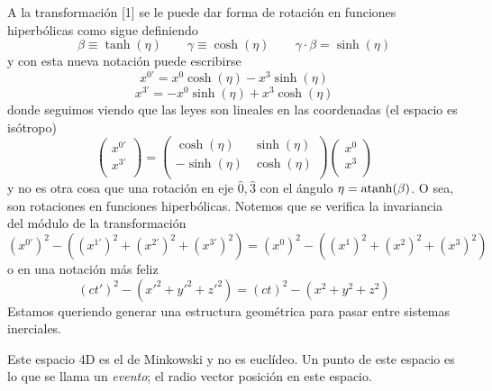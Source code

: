 \documentclass[10pt,oneside]{CBFT_book}
\begin{document}
A la transformación [1] se le puede dar forma de rotación en funciones hiperbólicas como sigue
definiendo
\[
	\beta \equiv \tanh(\eta) \qquad \gamma \equiv \cosh(\eta) \qquad 
	\gamma\cdot \beta = \sinh(\eta)
\]
y con esta nueva notación puede escribirse
\[
	x^{0'} = x^0 \cosh( \eta ) - x^3 \sinh( \eta )
\]
\[
	x^{3'} = -x^0 \sinh( \eta ) + x^3 \cosh( \eta )
\]
donde seguimos viendo que las leyes son lineales en las coordenadas (el espacio es isótropo)
\[
	\begin{pmatrix}
	 x^{0'} \\
	 x^{3'} \\
	\end{pmatrix}
	=
	\begin{pmatrix}
	\cosh( \eta ) & \sinh( \eta ) \\
	-\sinh( \eta ) & \cosh( \eta ) \\
	\end{pmatrix}
	\begin{pmatrix}
	 x^{0} \\
	 x^{3} \\
	\end{pmatrix}
\]
y no es otra cosa  que una rotación en eje $\hat{0}, \hat{3}$ con el ángulo $\eta = \mathrm{ atanh }( \beta )$.
O sea, son rotaciones en funciones hiperbólicas.
Notemos que se verifica la invariancia del módulo de la transformación
\[
	(x^{0'})^2 -  ( (x^{1'})^2  + (x^{2'})^2 + (x^{3'})^2 ) =
		(x^{0})^2 -  ( (x^{1})^2  + (x^{2})^2 + (x^{3})^2 ) 
\]
o en una notación más feliz
\[
	(ct')^2 - ( x'^2 + y'^2 + z'^2 ) = (ct)^2 - ( x^2 + y^2 + z^2 )
\]
Estamos queriendo generar una estructura geométrica para pasar entre sistemas inerciales.

	
Este espacio 4D es el de Minkowski y no es euclídeo.
Un punto de este espacio es lo que se llama un {\it evento}; el radio vector posición en
este espacio.
\end{document}
